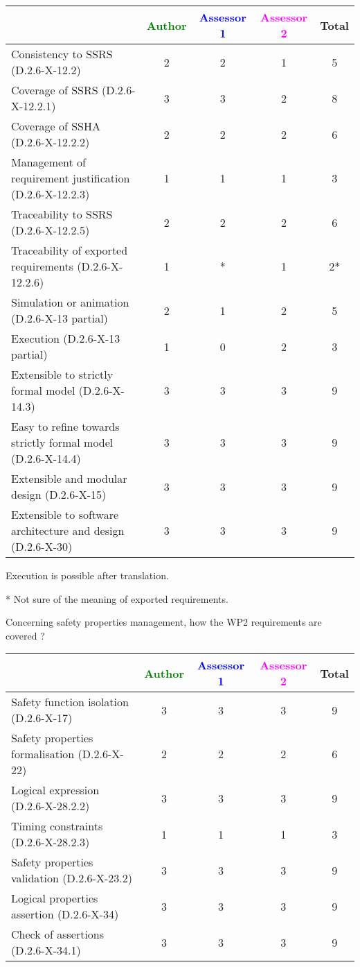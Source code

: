 \begin{tabular}{|l | c | c | c | c|}
\hline
& \textcolor{green}{Author} & \textcolor{blue}{Assessor 1} & \textcolor{magenta}{Assessor 2} & Total \\
\hline 
Consistency to SSRS (D.2.6-X-12.2) & 2 & 2 & 1 & 5 \\
\hline
Coverage of SSRS (D.2.6-X-12.2.1)  & 3 & 3 & 2 & 8 \\
\hline
Coverage of SSHA (D.2.6-X-12.2.2)  & 2 & 2 & 2 & 6 \\
\hline
Management of requirement justification (D.2.6-X-12.2.3)  & 1 & 1 & 1 & 3 \\
\hline
Traceability to  SSRS (D.2.6-X-12.2.5)  & 2 & 2 & 2 & 6 \\
\hline
Traceability of exported requirements (D.2.6-X-12.2.6)  & 1 & * & 1 & 2* \\
\hline
Simulation or animation (D.2.6-X-13 partial)  & 2 & 1 & 2 &  5 \\
\hline
Execution (D.2.6-X-13 partial)  & 1 & 0 & 2 & 3 \\
\hline
Extensible to strictly formal model (D.2.6-X-14.3) & 3 & 3 & 3 & 9  \\
\hline
Easy to  refine towards strictly formal model (D.2.6-X-14.4) & 3 & 3 & 3 & 9  \\
\hline
Extensible and modular design (D.2.6-X-15)  & 3 & 3 & 3 & 9 \\
\hline
Extensible to software architecture and design (D.2.6-X-30)   & 3 & 3 & 3 & 9 \\
\hline
\end{tabular}


\begin{author_comment}
Execution is possible after translation.
\end{author_comment}
\begin{assessor1}
* Not sure of the meaning of exported requirements.
\end{assessor1}

Concerning safety properties management, how the WP2 requirements are covered ?

\begin{tabular}{|l | c | c | c | c|}
\hline
& \textcolor{green}{Author} & \textcolor{blue}{Assessor 1} & \textcolor{magenta}{Assessor 2} & Total \\
\hline 
Safety function isolation (D.2.6-X-17)  & 3 & 3 & 3 & 9 \\
\hline 
Safety properties formalisation (D.2.6-X-22)  & 2 & 2 & 2 & 6 \\
\hline
Logical expression (D.2.6-X-28.2.2)  & 3 & 3 & 3 & 9 \\
\hline
Timing constraints (D.2.6-X-28.2.3)  & 1 & 1 & 1 & 3 \\
\hline
Safety properties validation (D.2.6-X-23.2)  & 3 & 3 & 3 & 9 \\
\hline
Logical properties assertion (D.2.6-X-34)  &  3 & 3 & 3 & 9 \\
\hline
Check  of assertions (D.2.6-X-34.1)  & 3 & 3 & 3 & 9 \\
\hline
\end{tabular}


